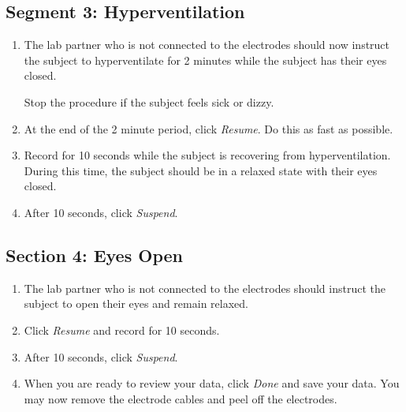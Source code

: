 \documentclass{article}
\begin{document}
\subsection*{Segment 3: Hyperventilation}
\begin{enumerate}
	\item The lab partner who is not connected to the electrodes should now instruct the subject to hyperventilate for 2 minutes while the subject has their eyes closed.\begin{warn}
		Stop the procedure if the subject feels sick or dizzy.
	\end{warn}
	
	\item At the end of the 2 minute period, click \textit{Resume}. Do this as fast as possible.
	\item Record for 10 seconds while the subject is recovering from hyperventilation. During this time, the subject should be in a relaxed state with their eyes closed.
	\item After 10 seconds, click \textit{Suspend}.
\end{enumerate}

\subsection*{Section 4: Eyes Open}
\begin{enumerate}
	\item The lab partner who is not connected to the electrodes should instruct the subject to open their eyes and remain relaxed.
	\item Click \textit{Resume} and record for 10 seconds.
	\item After 10 seconds, click \textit{Suspend}.
	\item When you are ready to review your data, click \textit{Done} and save your data. You may now remove the electrode cables and peel off the electrodes.
\end{enumerate}
\end{document}
